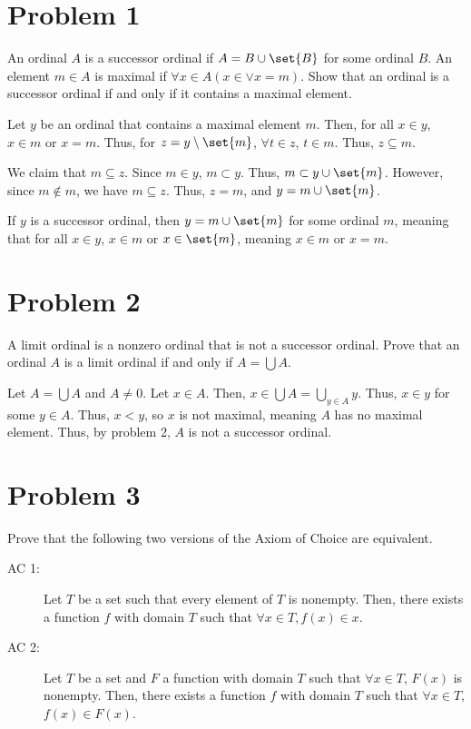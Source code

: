 \documentclass[10pt]{mypackage}
\begin{document}
\RaggedRight
\section{Problem 1}%
\begin{problem}
  An ordinal $A$ is a successor ordinal if $A = B\cup \set{B}$ for some ordinal $B$. An element $m\in A$ is maximal if $\forall x\in A\left(x \in \vee x = m\right)$. Show that an ordinal is a successor ordinal if and only if it contains a maximal element.
\end{problem}
\begin{solution}
  Let $y$ be an ordinal that contains a maximal element $m$. Then, for all $x\in y$, $x\in m$ or $x = m$. Thus, for $z = y\setminus \set{m}$, $\forall t\in z$, $ t\in m$. Thus, $z\subseteq m$. \newline

  We claim that $m\subseteq z$. Since $m\in y$, $m\subset y$. Thus, $m\subset y\cup \set{m}$. However, since $m\notin m$, we have $m\subseteq z$. Thus, $z = m$, and $y = m\cup\set{m}$.\newline

  If $y$ is a successor ordinal, then $y = m\cup\set{m}$ for some ordinal $m$, meaning that for all $x\in y$, $x\in m$ or $x \in \set{m}$, meaning $x\in m$ or $x = m$.
  
\end{solution}
\section{Problem 2}%
\begin{problem}
  A limit ordinal is a nonzero ordinal that is not a successor ordinal. Prove that an ordinal $A$ is a limit ordinal if and only if $A = \bigcup A$.
\end{problem}
\begin{solution}
  Let $A = \bigcup A$ and $A\neq 0$. Let $x\in A$. Then, $x\in \bigcup A = \bigcup_{y\in A}y$. Thus, $x\in y$ for some $y\in A$. Thus, $x < y$, so $x$ is not maximal, meaning $A$ has no maximal element. Thus, by problem 2, $A$ is not a successor ordinal.
\end{solution}

\section{Problem 3}%
\begin{problem}
  Prove that the following two versions of the Axiom of Choice are equivalent.
  \begin{description}
    \item[AC 1:] Let $T$ be a set such that every element of $T$ is nonempty. Then, there exists a function $f$ with domain $T$ such that $\forall x\in T, f(x)\in x$.
    \item[AC 2:] Let $T$ be a set and $F$ a function with domain $T$ such that $\forall x\in T$, $F(x)$ is nonempty. Then, there exists a function $f$ with domain $T$ such that $\forall x\in T$, $f(x)\in F(x)$.
  \end{description}
\end{problem}
\end{document}
